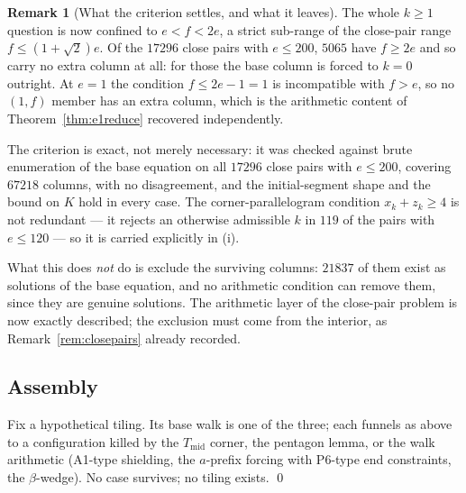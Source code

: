 \documentclass[11pt,reqno]{amsart}
\theoremstyle{plain}
\theoremstyle{definition}
\newtheorem{remark}[theorem]{Remark}
\begin{document}
\begin{remark}[What the criterion settles, and what it leaves]\label{rem:sharpcolumnscope}
The whole $k\ge1$ question is now confined to $e<f<2e$, a strict sub-range of the close-pair range
$f\le(1+\sqrt2)e$. Of the $17296$ close pairs with $e\le200$, $5065$ have $f\ge2e$ and so carry no
extra column at all: for those the base column is forced to $k=0$ outright. At $e=1$ the condition
$f\le2e-1=1$ is incompatible with $f>e$, so no $(1,f)$ member has an extra column, which is the
arithmetic content of Theorem~\ref{thm:e1reduce} recovered independently.

The criterion is exact, not merely necessary: it was checked against brute enumeration of the base
equation on all $17296$ close pairs with $e\le200$, covering $67218$ columns, with no disagreement,
and the initial-segment shape and the bound on $K$ hold in every case. The corner-parallelogram
condition $x_k+z_k\ge4$ is not redundant --- it rejects an otherwise admissible $k$ in $119$ of the
pairs with $e\le120$ --- so it is carried explicitly in (i).

What this does \emph{not} do is exclude the surviving columns: $21837$ of them exist as solutions of
the base equation, and no arithmetic condition can remove them, since they are genuine solutions.
The arithmetic layer of the close-pair problem is now exactly described; the exclusion must come
from the interior, as Remark~\ref{rem:closepairs} already recorded.
\end{remark}

\subsection{Assembly}
Fix a hypothetical tiling. Its base walk is one of the three; each funnels as above to a
configuration killed by the $T_{\mathrm{mid}}$ corner, the pentagon lemma, or the walk arithmetic
(A1-type shielding, the $a$-prefix forcing with P6-type end constraints, the $\beta$-wedge). No
case survives; no tiling exists. \qed
\end{document}
